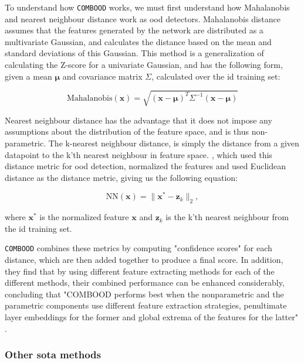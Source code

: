\documentclass[UKenglish]{uiomasterthesis} %
\theoremstyle{definition}
\begin{document}
To understand how \texttt{COMBOOD} works, we must first understand how Mahalanobis and nearest neighbour distance work as \ac{ood} detectors. Mahalanobis distance assumes that the features generated by the network are distributed as a multivariate Gaussian, and calculates the distance based on the mean and standard deviations of this Gaussian. This method is a generalization of calculating the Z-score for a univariate Gaussian, and has the following form, given a mean $\bm{\mu}$ and covariance matrix $\Sigma$, calculated over the \ac{id} training set:

\begin{equation}
    \text{Mahalanobis}(\bm{x}) = \sqrt{(\bm{x} - \bm{\mu})^T\Sigma^{-1}(\bm{x} - \bm{\mu})}
\end{equation}

\noindent Nearest neighbour distance has the advantage that it does not impose any assumptions about the distribution of the feature space, and is thus non-parametric. The k-nearest neighbour distance, is simply the distance from a given datapoint to the k'th nearest neighbour in feature space. \cite{nearestneighbour}, which used this distance metric for \ac{ood} detection, normalized the features and used Euclidean distance as the distance metric, giving us the following equation:

\begin{equation}
    \text{NN}(\bm{x}) = \| \bm{x^*} - \bm{z}_k \|_2,
\end{equation}

where $\bm{x^*}$ is the normalized feature $\bm{x}$ and $\bm{z}_k$ is the k'th nearest neighbour from the \ac{id} training set.

\texttt{COMBOOD} combines these metrics by computing "confidence scores" for each distance, which are then added together to produce a final score. In addition, they find that by using different feature extracting methods for each of the different methods, their combined performance can be enhanced considerably, concluding that "COMBOOD performs best when the nonparametric and the parametric components use different feature extraction strategies, penultimate layer embeddings for the former and global extrema of the features for the latter" \cite{combood}.

\subsubsection{Other \acl{sota} methods}
\end{document}
